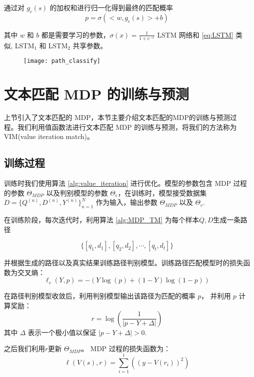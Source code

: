 通过对 $g_c(s)$ 的加权和进行归一化得到最终的匹配概率
\begin{equation}
\label{eq:TM_classfiy}
p = \sigma(<w, g_c(s)> + b)
\end{equation}

其中 $w$ 和 $b$ 都是需要学习的参数，$\sigma(x) = \frac{1}{1+e^{-x}}$
LSTM 网络和 \ref{eq:LSTM} 类似, LSTM$_1$  和 LSTM$_2$ 共享参数。

\begin{figure}[!htbp]
    \centering
    \texttt{[image: path\_classify]}
    \label{fig:path_classify}
\end{figure}

\section{文本匹配 MDP 的训练与预测}
上节引入了文本匹配的 MDP，本节主要介绍文本匹配的MDP的训练与预测过程。我们利用值函数法进行文本匹配 MDP 的训练与预测，将我们的方法称为VIM(value iteration match)。
\subsection{训练过程}
训练时我们使用算法 \ref{alg:value_iteration} 进行优化。模型的参数包含 MDP 过程的参数 $\Theta_{MDP}$ 以及判别模型的参数 $\Theta_{c}$，在训练时，模型接受数据集 $D=\{Q^{(n)}, D^{(n)}, Y^{(n)}\}_{n=1}^N$ 作为输入，输出参数 $\Theta_{MDP}$ 以及 $\Theta_{c}$.

在训练阶段，每次迭代时，利用算法 \ref{alg:MDP_TM} 为每个样本$Q, D$生成一条路径

$$\{[q_1, d_1], [q_2, d_2], \cdots, [q_t, d_t]\}$$

并根据生成的路径以及真实结果训练路径判别模型。训练路径匹配模型时的损失函数为交叉熵：
\begin{equation}
\label{eq:classify_model}
\ell_c(Y, p) = -(Y\log(p) + (1-Y)\log(1-p))
\end{equation}

在路径判别模型收敛后，利用判别模型输出该路径为匹配的概率 $p$， 并利用 $p$ 计算奖励：
$$
r = \log(\frac{1}{|p-Y+\Delta|})
$$
其中 $\Delta$ 表示一个极小值以保证 $|p-Y+\Delta| > 0$.

之后我们利用$r$更新 $\Theta_{MDP}$。 MDP 过程的损失函数为：
\begin{equation}
\label{eq:MDP_model}
\ell(V(s), r) = \sum_{i=1}^t\left((y - V(r_i))^2\right)
\end{equation}

